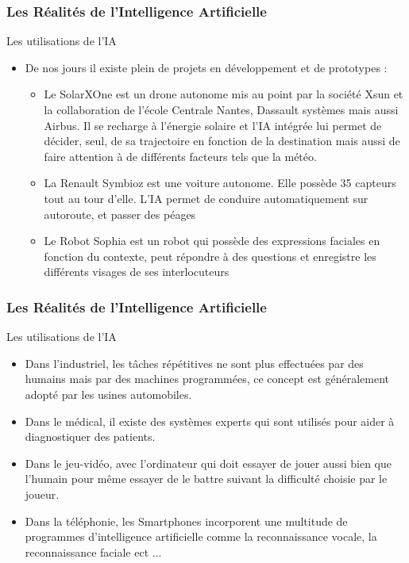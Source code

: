 \documentclass{beamer}
\begin{document}
	\begin{frame}
	\frametitle{Les Réalités de l'Intelligence Artificielle}
	\begin{block}{Les utilisations de l'IA}
	\begin{itemize}
	\itemsep1em
		\item De nos jours il existe plein de projets en développement et de prototypes :
		\begin{itemize}
		\itemsep1em
		\item Le SolarXOne est un drone autonome mis au point par la société Xsun et la collaboration de l’école Centrale Nantes, Dassault systèmes mais aussi Airbus. Il se recharge à l'énergie solaire et l'IA intégrée lui permet de décider, seul, de sa trajectoire en fonction de la destination mais aussi de faire attention à de différents facteurs tels que la météo.
		\item La Renault Symbioz est une voiture autonome. Elle possède 35 capteurs tout au tour d'elle. L'IA permet de conduire automatiquement sur autoroute, et passer des péages
		\item Le Robot Sophia est un robot qui possède des expressions faciales en fonction du contexte, peut répondre à des questions et enregistre les différents visages de ses interlocuteurs
		\end{itemize}
		\end{itemize}
	\end{block}
	\end{frame}
	
	\begin{frame}
	\frametitle{Les Réalités de l'Intelligence Artificielle}
	\begin{block}{Les utilisations de l'IA}
	\begin{itemize}
	\itemsep1em
		\item Dans l'industriel, les tâches répétitives ne sont plus effectuées par des humains mais par des machines programmées, ce concept est généralement adopté par les usines automobiles.
		\item Dans le médical, il existe des systèmes experts qui sont utilisés pour aider à diagnostiquer des patients.
		\item Dans le jeu-vidéo, avec l'ordinateur qui doit essayer de jouer aussi bien que l'humain pour même essayer de le battre suivant la difficulté choisie par le joueur.
		\item Dans la téléphonie, les Smartphones incorporent une multitude de programmes d'intelligence artificielle comme la reconnaissance vocale, la reconnaissance faciale ect ...
	\end{itemize}
	\end{block}
	\end{frame}
	
\end{document}
